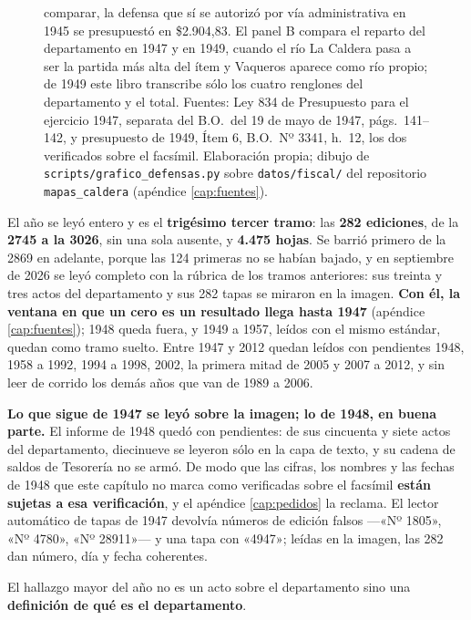 \begin{figure}[p]
{comparar, la defensa que sí se autorizó por vía administrativa en 1945 se presupuestó en \$2.904,83. El panel B compara el
reparto del departamento en 1947 y en 1949, cuando el río La Caldera pasa a ser la partida más alta
del ítem y Vaqueros aparece como río propio; de 1949 este libro transcribe sólo los cuatro renglones
del departamento y el total. Fuentes: Ley 834 de Presupuesto para el ejercicio 1947, separata del
B.O.\ del 19 de mayo de 1947, págs.\ 141--142, y presupuesto de 1949, Ítem 6, B.O.\ Nº 3341,
h.\ 12, los dos verificados sobre el facsímil. Elaboración propia; dibujo de
\texttt{scripts/grafico\_defensas.py} sobre \texttt{datos/fiscal/} del repositorio
\texttt{mapas\_caldera} (apéndice \ref{cap:fuentes}).}
\label{fig:defensas}
\end{figure}


El año se leyó entero y es el \textbf{trigésimo tercer tramo}: las \textbf{282 ediciones}, de la
\textbf{2745 a la 3026}, sin una sola ausente, y \textbf{4.475 hojas}. Se barrió primero de la 2869 en
adelante, porque las 124 primeras no se habían bajado, y en septiembre de 2026 se leyó completo con la
rúbrica de los tramos anteriores: sus treinta y tres actos del departamento y sus 282 tapas se miraron en
la imagen. \textbf{Con él, la ventana en que un cero es un resultado llega hasta 1947} (apéndice
\ref{cap:fuentes}); 1948 queda fuera, y 1949 a 1957, leídos con el mismo estándar, quedan como
tramo suelto. Entre 1947 y 2012 quedan leídos con pendientes 1948, 1958 a 1992, 1994 a 1998, 2002, la primera mitad de 2005 y 2007 a 2012, y sin leer de corrido los demás años
que van de 1989 a 2006.

\begin{cautela}
\textbf{Lo que sigue de 1947 se leyó sobre la imagen; lo de 1948, en buena parte.} El informe de 1948
quedó con pendientes: de sus cincuenta y siete actos del departamento, diecinueve se leyeron sólo en la
capa de texto, y su cadena de saldos de Tesorería no se armó. De modo que las cifras, los nombres y las
fechas de 1948 que este capítulo no marca como verificadas sobre el facsímil \textbf{están sujetas a esa
verificación}, y el apéndice \ref{cap:pedidos} la reclama. El lector automático de tapas de 1947
devolvía números de edición falsos ---«Nº 1805», «Nº 4780», «Nº 28911»--- y una tapa con «4947»;
leídas en la imagen, las 282 dan número, día y fecha coherentes.
\end{cautela}

El hallazgo mayor del año no es un acto sobre el departamento sino una \textbf{definición
de qué es el departamento}.

